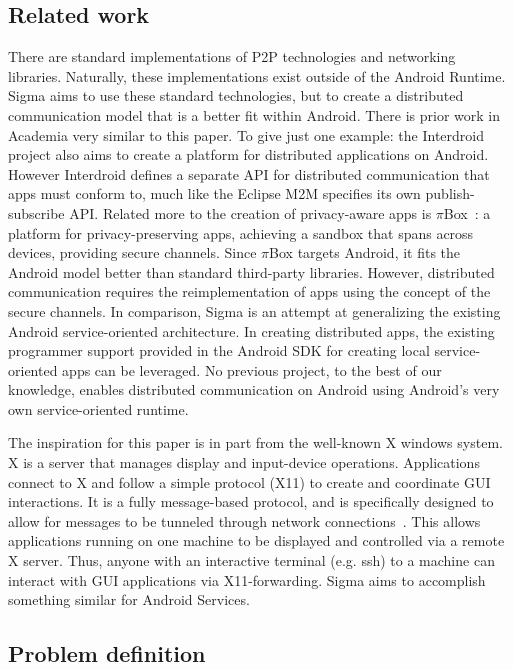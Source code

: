 \documentclass[prodmode]{acmlarge}
\begin{document}
\subsection{Related work}
There are standard implementations of P2P technologies and networking libraries. Naturally, these implementations exist outside of the Android Runtime. Sigma aims to use these standard technologies, but to create a distributed communication model that is a better fit within Android. There is prior work in Academia very similar to this paper. To give just one example: the Interdroid~\cite{Interdroid,PalmerThesis} project also aims to create a platform for distributed applications on Android. However Interdroid defines a separate API for distributed communication that apps must conform to, much like the Eclipse M2M specifies its own publish-subscribe API. Related more to the creation of privacy-aware apps is $\pi$Box~\cite{piBox}: a platform for privacy-preserving apps, achieving a sandbox that spans across devices, providing secure channels. Since $\pi$Box targets Android, it fits the Android model better than standard third-party libraries. However, distributed communication requires the reimplementation of apps using the concept of the secure channels. In comparison, Sigma is an attempt at generalizing the existing Android service-oriented architecture. In creating distributed apps, the existing programmer support provided in the Android SDK for creating local service-oriented apps can be leveraged. No previous project, to the best of our knowledge, enables distributed communication on Android using Android's very own service-oriented runtime.

The inspiration for this paper is in part from the well-known X windows system. X is a server that manages display and input-device operations. Applications connect to X and follow a simple protocol (X11) to create and coordinate GUI interactions. It is a fully message-based protocol, and is specifically designed to allow for messages to be tunneled through network connections~\cite{X11}. This allows applications running on one machine to be displayed and controlled via a remote X server. Thus, anyone with an interactive terminal (e.g. ssh) to a machine can interact with GUI applications via X11-forwarding. Sigma aims to accomplish something similar for Android Services.

\subsection{Problem definition}
\end{document}
